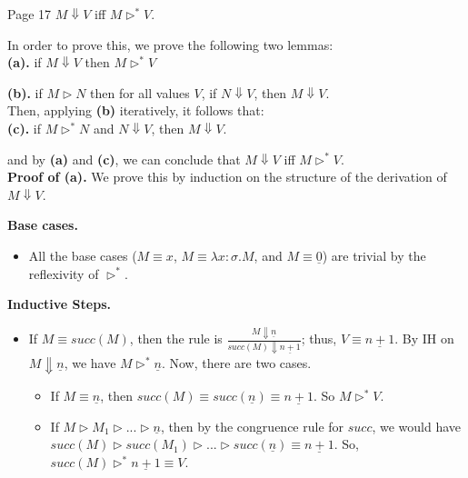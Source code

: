 \begin{problem}{Page 17}
    $M \Downarrow V$ iff $M \rhd^* V$.
\end{problem}

\begin{solution}
    In order to prove this, we prove the following two lemmas: \\

    \textbf{(a).} if $M \Downarrow V$ then $M \rhd^* V$

    \textbf{(b).} if $M \rhd N$ then for all values $V$, if $N \Downarrow V$, then $M \Downarrow V$. \\
    
    Then, applying \textbf{(b)} iteratively, it follows that: \\

    \textbf{(c).} if $M \rhd^* N$ and $N \Downarrow V$, then $M \Downarrow V$.

    and by \textbf{(a)} and \textbf{(c)}, we can conclude that $M \Downarrow V$ iff $M \rhd^* V$. \\
    \textbf{Proof of (a).} We prove this by induction on the structure of the derivation of $M \Downarrow V$. 

    \textbf{Base cases.}
    \begin{itemize}
        \item All the base cases ($M \equiv x$, $M \equiv \lambda x:\sigma.M$, and $M \equiv \underline{0}$) are trivial by the reflexivity of $\rhd^*$.
    \end{itemize}

    \textbf{Inductive Steps.}
    \begin{itemize}
        \item If $M \equiv succ(M)$, then the rule is $\frac{M \Downarrow \underline{n}}{succ(M) \Downarrow \underline{n+1}}$; thus, $V \equiv \underline{n+1}$.
              By IH on $M \Downarrow \underline{n}$, we have $M \rhd^* \underline{n}$. Now, there are two cases.
              \begin{itemize}
                \item If $M \equiv \underline{n}$, then $succ(M) \equiv succ(\underline{n}) \equiv \underline{n+1}$. So $M \rhd^* V$.
                \item If $M \rhd M_1 \rhd ... \rhd \underline{n}$, then by the congruence rule for $succ$, we would have $succ(M) \rhd succ(M_1) \rhd ... \rhd succ(\underline{n}) \equiv \underline{n+1}$.
                      So, $succ(M) \rhd^* \underline{n+1} \equiv V$.
              \end{itemize}
        

\end{itemize}
\end{solution}
